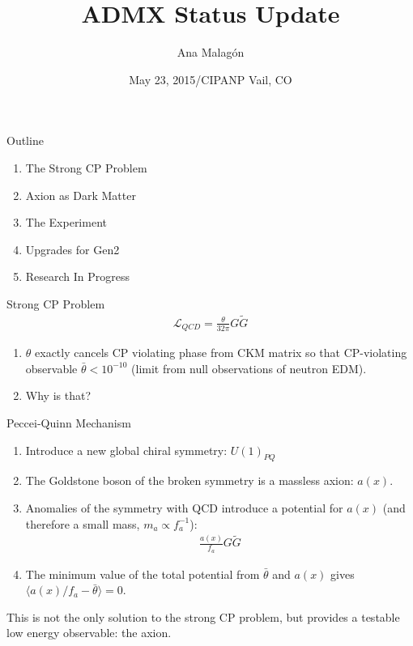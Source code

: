 \documentclass{beamer}
\title[CIPANP Vail, CO]
{ADMX Status Update}
\author[Malagon]
{Ana Malag\'on}
\institute[University of Washington]
{University of Washington, ADMX Collaboration}
\date[May 23, 2015]
{May 23, 2015/CIPANP Vail, CO}
\begin{document}
\begin{frame}
\titlepage
\end{frame}

\begin{frame}{Outline}
\begin{enumerate}
\item The Strong CP Problem\medskip
\item Axion as Dark Matter\medskip
\item The Experiment\medskip
\item Upgrades for Gen2\medskip
\item Research In Progress\medskip
\end{enumerate}

\end{frame}

\begin{frame}{Strong CP Problem}
\begin{align*}
\mathcal{L}_{QCD} = \frac{\theta}{32 \pi}G\tilde G
\end{align*}

\begin{enumerate}
\item $\theta$ exactly cancels CP violating phase from CKM matrix so that CP-violating observable $\bar{\theta} < 10^{-10}$ (limit from null observations of neutron EDM).\medskip
\item Why is that?

\end{enumerate}

\end{frame}


\begin{frame}{Peccei-Quinn Mechanism}
\begin{enumerate}
\item Introduce a new global chiral symmetry: $U(1)_{PQ}$
\item The Goldstone boson of the broken symmetry is a massless axion: $a(x)$.
\item Anomalies of the symmetry with QCD introduce a potential for $a(x)$ {\tiny (and therefore a small mass, $m_a \propto f_a^{-1}$)}: 
\begin{align*}
\frac{a(x)}{f_a}G\tilde G
\end{align*}
\item The minimum value of the total potential from $\bar{\theta}$ and $a(x)$ gives $\langle a(x)/f_a - \bar{\theta} \rangle = 0$.
\end{enumerate}

This is not the only solution to the strong CP problem, but provides a testable low energy observable: the axion.
\end{frame}
\end{document}
